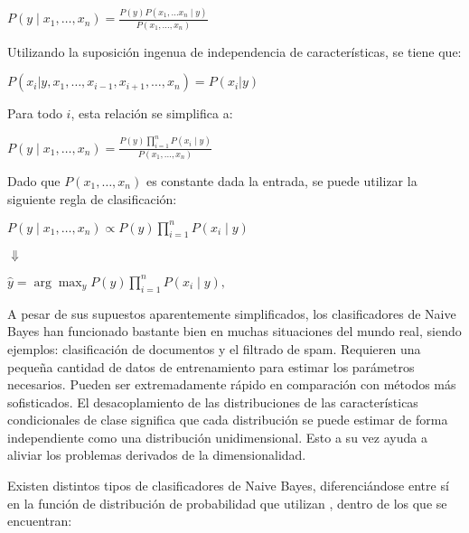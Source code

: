 \begin{center}
	$P(y \mid x_1, \dots, x_n) = \frac{P(y) P(x_1, \dots x_n \mid y)} {P(x_1, \dots, x_n)}
	$
\end{center}

Utilizando la suposición ingenua de independencia de características, se tiene que:

\begin{center}
	$P(x_i | y, x_1, \dots, x_{i-1}, x_{i+1}, \dots, x_n) = P(x_i | y)$
\end{center}

Para todo $i$, esta relación se simplifica a:

\begin{center}
	$P(y \mid x_1, \dots, x_n) = \frac{P(y) \prod_{i=1}^{n} P(x_i \mid y)} {P(x_1, \dots, x_n)}$
\end{center}

Dado que $P(x_1, \dots, x_n)$ es constante dada la entrada, se puede utilizar la siguiente regla de clasificación:

\begin{center}
	$P(y \mid x_1, \dots, x_n) \propto P(y) \prod_{i=1}^{n} P(x_i \mid y)$
	
\end{center}

\begin{center}
	$\Downarrow$ 
\end{center}
\begin{center}
	$\hat{y} = \arg\max_y P(y) \prod_{i=1}^{n} P(x_i \mid y),$
\end{center}

A pesar de sus supuestos aparentemente simplificados, los clasificadores de Naive Bayes han funcionado bastante bien en muchas situaciones del mundo real, siendo ejemplos: clasificación de documentos y el filtrado de spam. Requieren una pequeña cantidad de datos de entrenamiento para estimar los parámetros necesarios. Pueden ser extremadamente rápido en comparación con métodos más sofisticados. El desacoplamiento de las distribuciones de las características condicionales de clase significa que cada distribución se puede estimar de forma independiente como una distribución unidimensional. Esto a su vez ayuda a aliviar los problemas derivados de la dimensionalidad. 

Existen distintos tipos de clasificadores de Naive Bayes, diferenciándose entre sí en la función de distribución de probabilidad que utilizan \cite{metsis2006spam,john1995estimating,manning2010introduction}, dentro de los que se encuentran:

